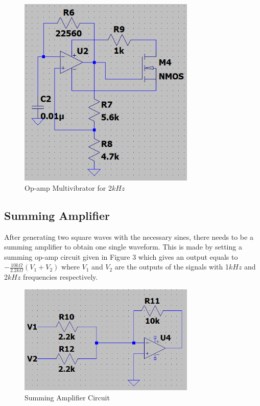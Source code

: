 \documentclass[letterpaper,12pt]{article}
\begin{document}
\begin{figure}[H]
    \centering
    \includegraphics[width = 0.75\textwidth]{2K.png}
    \caption{Op-amp Multivibrator for 2\(kHz\)}
\end{figure} 


\subsection{Summing Amplifier}
After generating two square waves with the necessary sines, there needs to be a summing amplifier to obtain one single waveform. This is made by setting a summing op-amp circuit given in Figure 3 which gives an output equals to \(- \frac{10k\Omega }{2.2k\Omega }(V_1 + V_2)\) where \(V_1\) and \(V_2\) are the outputs of the signals with  1\(kHz\) and 2\(kHz\) frequencies respectively.


\begin{figure}[H]
    \centering
    \includegraphics[width = 0.75\textwidth]{SUMM.png}
    \caption{Summing Amplifier Circuit}
\end{figure} 
\end{document}
